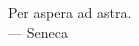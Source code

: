 
\cleardoublepage
{}
\thispagestyle{empty}

\vspace*{3cm}

\begin{center}
Per aspera ad astra. \\ \medskip
--- Seneca    
\end{center}

\medskip

